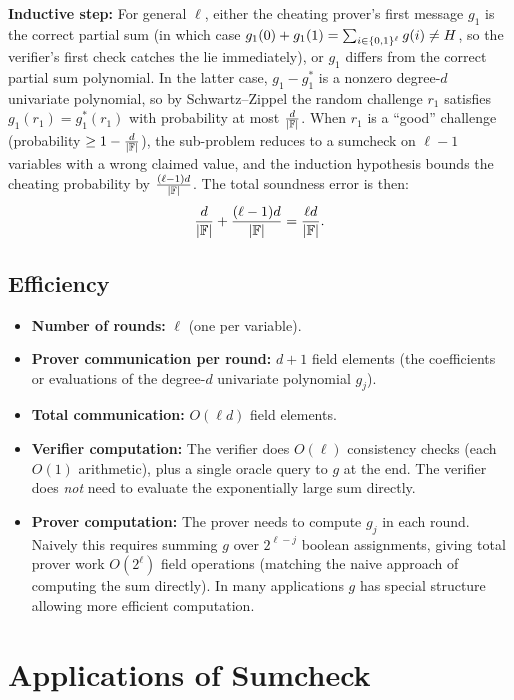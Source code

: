 \documentclass[11pt]{article}
\begin{document}
\textbf{Inductive step:} For general $\ell$, either the cheating prover's first message $g_1$ is
the correct partial sum (in which case $g_1(0) + g_1(1) = \sum_{i \in \{0,1\}^\ell} g(i) \neq H$,
so the verifier's first check catches the lie immediately), or $g_1$ differs from the correct
partial sum polynomial. In the latter case, $g_1 - g_1^*$ is a nonzero degree-$d$ univariate
polynomial, so by Schwartz--Zippel the random challenge $r_1$ satisfies $g_1(r_1) = g_1^*(r_1)$
with probability at most $\frac{d}{|\mathbb{F}|}$. When $r_1$ is a ``good'' challenge (probability $\geq
1 - \frac{d}{|\mathbb{F}|}$), the sub-problem reduces to a sumcheck on $\ell-1$ variables with a wrong
claimed value, and the induction hypothesis bounds the cheating probability by $\frac{(\ell-1)d}{|\mathbb{F}|}$.
The total soundness error is then:
\[
  \frac{d}{|\mathbb{F}|} + \frac{(\ell-1)d}{|\mathbb{F}|} = \frac{\ell d}{|\mathbb{F}|}.
\]

\subsection{Efficiency}

\begin{itemize}
  \item \textbf{Number of rounds:} $\ell$ (one per variable).
  \item \textbf{Prover communication per round:} $d + 1$ field elements (the coefficients or
        evaluations of the degree-$d$ univariate polynomial $g_j$).
  \item \textbf{Total communication:} $O(\ell d)$ field elements.
  \item \textbf{Verifier computation:} The verifier does $O(\ell)$ consistency checks (each $O(1)$
        arithmetic), plus a single oracle query to $g$ at the end. The verifier does \emph{not}
        need to evaluate the exponentially large sum directly.
  \item \textbf{Prover computation:} The prover needs to compute $g_j$ in each round. Naively this
        requires summing $g$ over $2^{\ell - j}$ boolean assignments, giving total prover work
        $O(2^\ell)$ field operations (matching the naive approach of computing the sum directly).
        In many applications $g$ has special structure allowing more efficient computation.
\end{itemize}

\section{Applications of Sumcheck}
\end{document}
